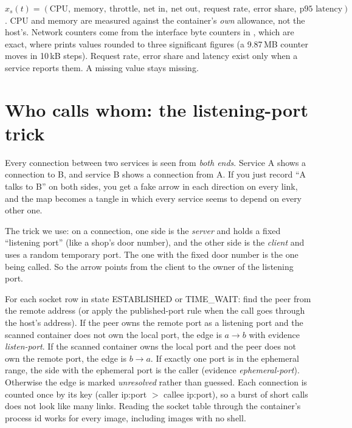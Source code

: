 \begin{techbox}
$x_s(t)=(\text{CPU},\ \text{memory},\ \text{throttle},\ \text{net in},\ \text{net out},\ \text{request rate},\ \text{error share},\ \text{p95 latency})$. CPU and memory are measured against the container's \emph{own} allowance, not the host's. Network counters come from the interface byte counters in , which are exact, where  prints values rounded to three significant figures (a 9.87\,MB counter moves in 10\,kB steps). Request rate, error share and latency exist only when a service reports them. A missing value stays missing.
\end{techbox}

\section{Who calls whom: the listening-port trick}
\begin{simplebox}
Every connection between two services is seen from \emph{both ends}. Service A shows a connection to B, and service B shows a connection from A. If you just record ``A talks to B'' on both sides, you get a fake arrow in each direction on every link, and the map becomes a tangle in which every service seems to depend on every other one.

The trick we use: on a connection, one side is the \emph{server} and holds a fixed ``listening port'' (like a shop's door number), and the other side is the \emph{client} and uses a random temporary port. The one with the fixed door number is the one being called. So the arrow points from the client to the owner of the listening port.
\end{simplebox}

\begin{techbox}
For each socket row in state ESTABLISHED or TIME\_WAIT: find the peer from the remote address (or apply the published-port rule when the call goes through the host's address). If the peer owns the remote port as a listening port and the scanned container does not own the local port, the edge is $a\to b$ with evidence \emph{listen-port}. If the scanned container owns the local port and the peer does not own the remote port, the edge is $b\to a$. If exactly one port is in the ephemeral range, the side with the ephemeral port is the caller (evidence \emph{ephemeral-port}). Otherwise the edge is marked \emph{unresolved} rather than guessed. Each connection is counted once by its key (caller ip:port $>$ callee ip:port), so a burst of short calls does not look like many links. Reading the socket table through the container's process id works for every image, including images with no shell.
\end{techbox}


